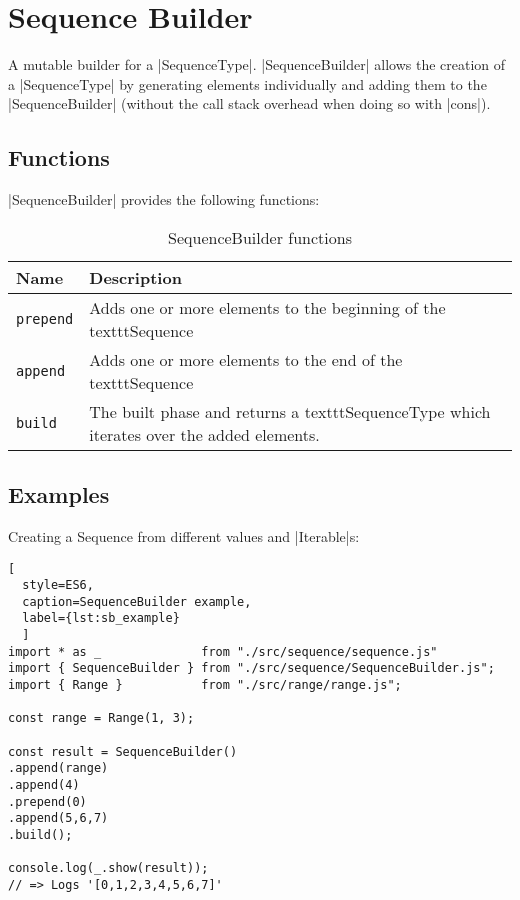 \section{Sequence Builder}
\label{sec:Sequence Builder}
A mutable builder for a |SequenceType|.
\newline
|SequenceBuilder| allows the creation of a |SequenceType| by generating elements individually 
and adding them to the |SequenceBuilder| (without the call stack overhead when doing so
with |cons|).

\subsection{Functions}
\label{sub:sb_Functions}

|SequenceBuilder| provides the following functions:

\begin{table}[H]
  \centering
  \begin{tabularx}{\textwidth}{| l | X |} \hline
    \textbf{Name}    & \textbf{Description} \\ \hline
    \texttt{prepend} & Adds one or more elements to the beginning of the texttt{Sequence}\\ \hline 
    \texttt{append}  & Adds one or more elements to the end of the texttt{Sequence} \\ \hline 
    \texttt{build}   & The built phase and returns a texttt{SequenceType} which iterates over the added elements. \\ \hline 
   \end{tabularx}
  \caption{SequenceBuilder functions}
  \label{tab:sb_functions}
\end{table}

\subsection{Examples}
\label{sub:sb_Examples}
Creating a Sequence from different values and |Iterable|s:

\begin{lstlisting}[
  style=ES6, 
  caption=SequenceBuilder example,
  label={lst:sb_example}
  ]
import * as _              from "./src/sequence/sequence.js"
import { SequenceBuilder } from "./src/sequence/SequenceBuilder.js";
import { Range }           from "./src/range/range.js";

const range = Range(1, 3);

const result = SequenceBuilder()
.append(range)
.append(4)
.prepend(0)
.append(5,6,7)
.build();

console.log(_.show(result));
// => Logs '[0,1,2,3,4,5,6,7]'
\end{lstlisting}
